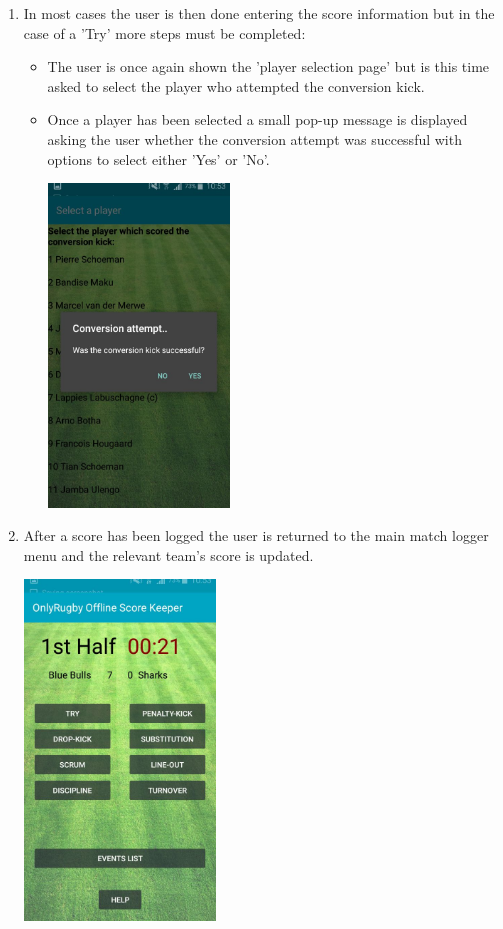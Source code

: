\documentclass[hidelinks,a4paper,12pt]{article}
\begin{document}
\begin{enumerate}
\begin{center}
		\end{center}
			\item In most cases the user is then done entering the score information but in the case of a 'Try' more steps must be completed:
				\begin{itemize}
					\item The user is once again shown the 'player selection page' but is this time asked to select the player who attempted the conversion kick.
					\item Once a player has been selected a small pop-up message is displayed asking the user whether the conversion attempt was successful with options to select either 'Yes' or 'No'.
				\begin{center}
  					 \includegraphics[width=0.4\textwidth] {./images/try_converted.jpg}\\[0.4cm]
				\end{center}
				\end{itemize}
		\item After a score has been logged the user is returned to the main match logger menu and the relevant team's score is updated.
		\begin{center}
  			 \includegraphics[width=0.4\textwidth] {./images/score_increased.jpg}\\[0.4cm]
		\end{center}
		\end{enumerate}
\end{document}
